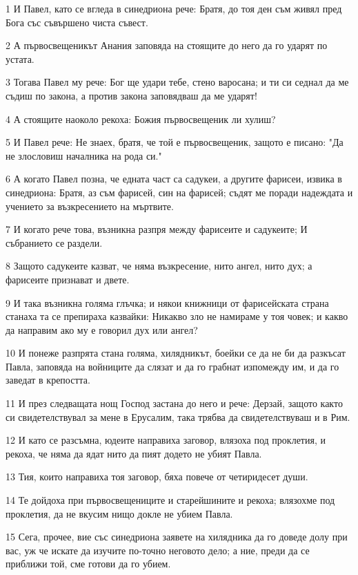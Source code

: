 \par 1 И Павел, като се вгледа в синедриона рече: Братя, до тоя ден съм живял пред Бога със съвършено чиста съвест.
\par 2 А първосвещеникът Анания заповяда на стоящите до него да го ударят по устата.
\par 3 Тогава Павел му рече: Бог ще удари тебе, стено варосана; и ти си седнал да ме съдиш по закона, а против закона заповядваш да ме ударят!
\par 4 А стоящите наоколо рекоха: Божия първосвещеник ли хулиш?
\par 5 И Павел рече: Не знаех, братя, че той е първосвещеник, защото е писано: "Да не злословиш началника на рода си."
\par 6 А когато Павел позна, че едната част са садукеи, а другите фарисеи, извика в синедриона: Братя, аз съм фарисей, син на фарисей; съдят ме поради надеждата и учението за възкресението на мъртвите.
\par 7 И когато рече това, възникна разпря между фарисеите и садукеите; И събранието се раздели.
\par 8 Защото садукеите казват, че няма възкресение, нито ангел, нито дух; а фарисеите признават и двете.
\par 9 И така възникна голяма глъчка; и някои книжници от фарисейската страна станаха та се препираха казвайки: Никакво зло не намираме у тоя човек; и какво да направим ако му е говорил дух или ангел?
\par 10 И понеже разпрята стана голяма, хилядникът, боейки се да не би да разкъсат Павла, заповяда на войниците да слязат и да го грабнат изпомежду им, и да го заведат в крепостта.
\par 11 И през следващата нощ Господ застана до него и рече: Дерзай, защото както си свидетелствувал за мене в Ерусалим, така трябва да свидетелствуваш и в Рим.
\par 12 И като се разсъмна, юдеите направиха заговор, влязоха под проклетия, и рекоха, че няма да ядат нито да пият додето не убият Павла.
\par 13 Тия, които направиха тоя заговор, бяха повече от четиридесет души.
\par 14 Те дойдоха при първосвещениците и старейшините и рекоха; влязохме под проклетия, да не вкусим нищо докле не убием Павла.
\par 15 Сега, прочее, вие със синедриона заявете на хилядника да го доведе долу при вас, уж че искате да изучите по-точно неговото дело; а ние, преди да се приближи той, сме готови да го убием.
